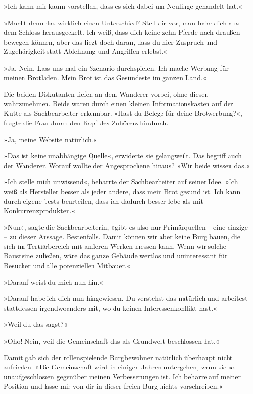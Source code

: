 »Ich kann mir kaum vorstellen, dass es sich dabei um Neulinge gehandelt hat.«

»Macht denn das wirklich einen Unterschied? Stell dir vor, man habe dich aus dem Schloss herausgeekelt. Ich weiß, dass dich keine zehn Pferde nach draußen bewegen können, aber das liegt doch daran, dass du hier Zuspruch und Zugehörigkeit statt Ablehnung und Angriffen erlebst.«

»Ja. Nein. Lass uns mal ein Szenario durchspielen. Ich mache Werbung für meinen Brotladen. Mein Brot ist das Gesündeste im ganzen Land.«

Die beiden Diskutanten liefen an dem Wanderer vorbei, ohne diesen wahrzunehmen. Beide waren durch einen kleinen Informationskasten auf der Kutte als Sachbearbeiter erkennbar. »Hast du Belege für deine Brotwerbung?«, fragte die Frau durch den Kopf des Zuhörers hindurch.

»Ja, meine Website natürlich.«

»Das ist keine unabhängige Quelle«, erwiderte sie gelangweilt. Das begriff auch der Wanderer. Worauf wollte der Angesprochene hinaus? »Wir beide wissen das.«

»Ich stelle mich unwissend«, beharrte der Sachbearbeiter auf seiner Idee. »Ich weiß als Hersteller besser als jeder andere, dass mein Brot gesund ist. Ich kann durch eigene Tests beurteilen, dass ich dadurch besser lebe als mit Konkurrenzprodukten.«

»Nun«, sagte die Sachbearbeiterin, »gibt es also nur Primärquellen – eine einzige – zu dieser Aussage. Bestenfalls. Damit können wir aber keine Burg bauen, die sich im Tertiärbereich mit anderen Werken messen kann. Wenn wir solche Bausteine zuließen, wäre das ganze Gebäude wertlos und uninteressant für Besucher und alle potenziellen Mitbauer.«

»Darauf weist du mich nun hin.«

»Darauf habe ich dich nun hingewiesen. Du verstehst das natürlich und arbeitest stattdessen irgendwoanders mit, wo du keinen Interessenkonflikt hast.«

»Weil du das sagst?«

»Oho! Nein, weil die Gemeinschaft das als Grundwert beschlossen hat.«

Damit gab sich der rollenspielende Burgbewohner natürlich überhaupt nicht zufrieden. »Die Gemeinschaft wird in einigen Jahren untergehen, wenn sie so unaufgeschlossen gegenüber meinen Verbesserungen ist. Ich beharre auf meiner Position und lasse mir von dir in dieser freien Burg nichts vorschreiben.«

